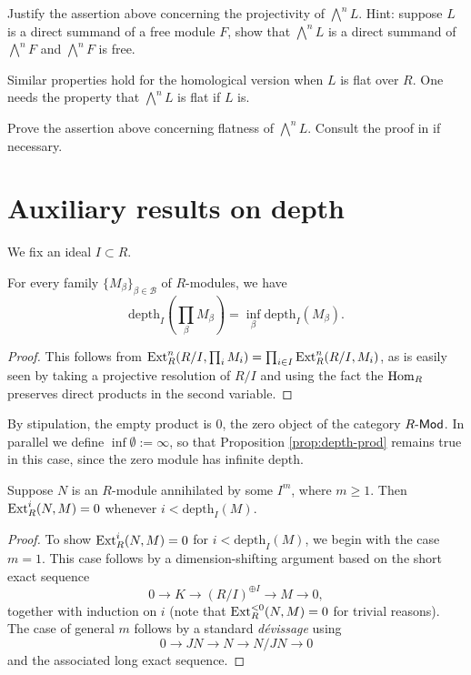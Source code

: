 \begin{exercise}
	Justify the assertion above concerning the projectivity of $\bigwedge^n L$. Hint: suppose $L$ is a direct summand of a free module $F$, show that $\bigwedge^n L$ is a direct summand of $\bigwedge^n F$ and $\bigwedge^n F$ is free.
\end{exercise}

Similar properties hold for the homological version when $L$ is flat over $R$. One needs the property that $\bigwedge^n L$ is flat if $L$ is.
\begin{exercise}
	Prove the assertion above concerning flatness of $\bigwedge^n L$. Consult the proof in \cite[p.15]{Bour80} if necessary.
\end{exercise}

\section{Auxiliary results on depth}
We fix an ideal $I \subset R$.
\begin{proposition}\label{prop:depth-prod}
	For every family $\{M_\beta\}_{\beta \in \mathcal{B}}$ of $R$-modules, we have
	\[ \mathrm{depth}_I\left(\prod_\beta M_\beta \right) = \inf_\beta \mathrm{depth}_I(M_\beta). \]
\end{proposition}
\begin{proof}
	This follows from $\operatorname{Ext}^n_R(R/I, \prod_i M_i) = \prod_{i \in I} \operatorname{Ext}^n_R(R/I, M_i)$, as is easily seen by taking a projective resolution of $R/I$ and using the fact the $\operatorname{Hom}_R$ preserves direct products in the second variable.
\end{proof}

\begin{remark}
	By stipulation, the empty product is $0$, the zero object of the category $R\text{-}\mathsf{Mod}$. In parallel we define $\inf\emptyset := \infty$, so that Proposition \ref{prop:depth-prod} remains true in this case, since the zero module has infinite depth.
\end{remark}

\begin{proposition}
	Suppose $N$ is an $R$-module annihilated by some $I^m$, where $m \geq 1$. Then $\operatorname{Ext}^i_R(N,M)=0$ whenever $i < \mathrm{depth}_I(M)$.
\end{proposition}
\begin{proof}
	To show $\operatorname{Ext}^i_R(N,M)=0$ for $i < \text{depth}_I(M)$, we begin with the case $m=1$. This case follows by a dimension-shifting argument based on the short exact sequence
	\[ 0 \to K \to (R/I)^{\oplus I} \to M \to 0, \]
	together with induction on $i$ (note that $\operatorname{Ext}^{<0}_R(N,M)=0$ for trivial reasons). The case of general $m$ follows by a standard \emph{dévissage} using
	\[ 0 \to JN \to N \to N/JN \to 0 \]
	and the associated long exact sequence.
\end{proof}

